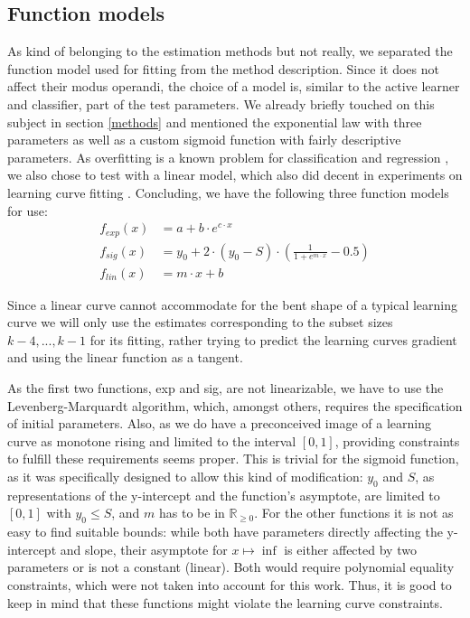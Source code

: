\subsection{Function models}

As kind of belonging to the estimation methods but not really, we separated the function model used for fitting from the method description. Since it does not affect their modus operandi, the choice of a model is, similar to the active learner and classifier, part of the test parameters. We already briefly touched on this subject in section \ref{methods} and mentioned the exponential law with three parameters as well as a custom sigmoid function with fairly descriptive parameters. As overfitting is a known problem for classification and regression \cite{Dietterich1995}, we also chose to test with a linear model, which also did decent in experiments on learning curve fitting \cite{FigueroaEtal2012}. Concluding, we have the following three function models for use:
\begin{subequations}
	\begin{align}
	f_{exp}(x) &= a + b \cdot e^{c \cdot x} \\
	f_{sig}(x) &= y_0 + 2 \cdot (y_0 - S) \cdot \left( \frac{1}{1+e^{m \cdot x}} - 0.5 \right) \\
	f_{lin}(x) &= m \cdot x + b
	\end{align}
\end{subequations}

Since a linear curve cannot accommodate for the bent shape of a typical learning curve we will only use the estimates corresponding to the subset sizes $k-4,...,k-1$ for its fitting, rather trying to predict the learning curves gradient and using the linear function as a tangent.

As the first two functions, exp and sig, are not linearizable, we have to use the Levenberg-Marquardt algorithm, which, amongst others, requires the specification of initial parameters. Also, as we do have a preconceived image of a learning curve as monotone rising and limited to the interval $[0, 1]$, providing constraints to fulfill these requirements seems proper. This is trivial for the sigmoid function, as it was specifically designed to allow this kind of modification: $y_0$ and $S$, as representations of the y-intercept and the function's asymptote, are limited to $[0,1]$ with $y_0 \leq S$, and $m$ has to be in $\mathbb{R}_{\geq 0}$. For the other functions it is not as easy to find suitable bounds: while both have parameters directly affecting the y-intercept and slope, their asymptote for $x \mapsto \inf$ is either affected by two parameters or is not a constant (linear). Both would require polynomial equality constraints, which were not taken into account for this work. Thus, it is good to keep in mind that these functions might violate the learning curve constraints.

